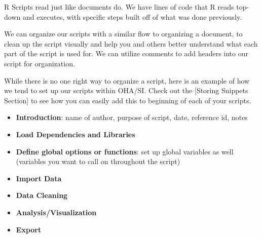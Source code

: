 \documentclass[
  letterpaper,
  DIV=11,
  numbers=noendperiod]{scrreprt}
\providecommand{\tightlist}{%
  \setlength{\itemsep}{0pt}\setlength{\parskip}{0pt}}\usepackage{longtable,booktabs,array}
\begin{document}
R Scripts read just like documents do. We have lines of code that R
reads top-down and executes, with specific steps built off of what was
done previously.

We can organize our scripts with a similar flow to organizing a
document, to clean up the script visually and help you and others better
understand what each part of the script is used for. We can utilize
comments to add headers into our script for organization.

While there is no one right way to organize a script, here is an example
of how we tend to set up our scripts within OHA/SI. Check out the
{[}Storing Snippets Section{]} to see how you can easily add this to
beginning of each of your scripts.

\begin{itemize}
\tightlist
\item
  \textbf{Introduction}: name of author, purpose of script, date,
  reference id, notes
\item
  \textbf{Load Dependencies and Libraries}
\item
  \textbf{Define global options or functions}: set up global variables
  as well (variables you want to call on throughout the script)
\item
  \textbf{Import Data}
\item
  \textbf{Data Cleaning}
\item
  \textbf{Analysis/Visualization}
\item
  \textbf{Export}
\end{itemize}
\end{document}
